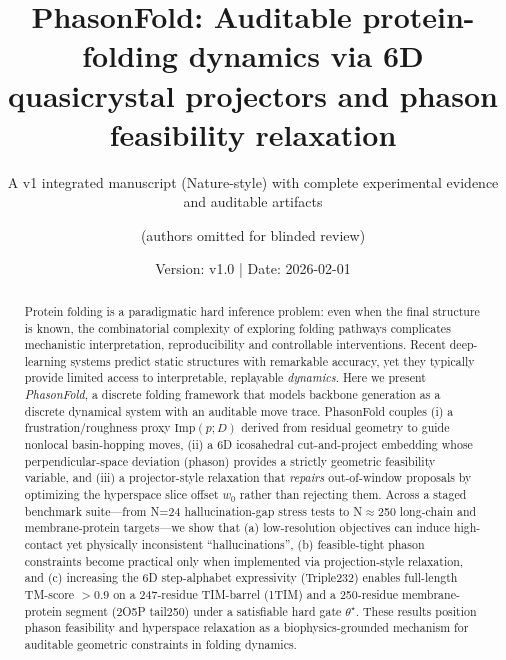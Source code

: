 \title{PhasonFold: Auditable protein-folding dynamics via 6D quasicrystal projectors and phason feasibility relaxation}
\subtitle{A v1 integrated manuscript (Nature-style) with complete experimental evidence and auditable artifacts}
\author{(authors omitted for blinded review)}
\date{Version: v1.0 | Date: 2026-02-01}
\maketitle
\begin{abstract}
Protein folding is a paradigmatic hard inference problem: even when the final structure is known, the combinatorial complexity of exploring folding pathways complicates mechanistic interpretation, reproducibility and controllable interventions. Recent deep-learning systems predict static structures with remarkable accuracy, yet they typically provide limited access to interpretable, replayable \emph{dynamics}. Here we present \emph{PhasonFold}, a discrete folding framework that models backbone generation as a discrete dynamical system with an auditable move trace. PhasonFold couples (i) a frustration/roughness proxy $\mathrm{Imp}(p;D)$ derived from residual geometry to guide nonlocal basin-hopping moves, (ii) a 6D icosahedral cut-and-project embedding whose perpendicular-space deviation (phason) provides a strictly geometric feasibility variable, and (iii) a projector-style relaxation that \emph{repairs} out-of-window proposals by optimizing the hyperspace slice offset $w_0$ rather than rejecting them. Across a staged benchmark suite---from N=24 hallucination-gap stress tests to N$\approx$250 long-chain and membrane-protein targets---we show that (a) low-resolution objectives can induce high-contact yet physically inconsistent ``hallucinations'', (b) feasible-tight phason constraints become practical only when implemented via projection-style relaxation, and (c) increasing the 6D step-alphabet expressivity (Triple232) enables full-length TM-score $>0.9$ on a 247-residue TIM-barrel (1TIM) and a 250-residue membrane-protein segment (2O5P tail250) under a satisfiable hard gate $\theta^\star$. These results position phason feasibility and hyperspace relaxation as a biophysics-grounded mechanism for auditable geometric constraints in folding dynamics.
\end{abstract}

